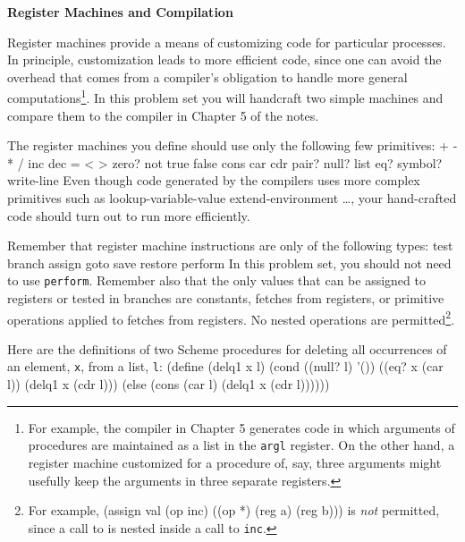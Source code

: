 

\newcommand{\Code}[1]{\mbox{\tt #1}}



\begin{center}
{\bf Register Machines and Compilation}
\end{center}

\medskip

Register machines provide a means of customizing code for particular
processes.  In principle, customization leads to more efficient code,
since one can avoid the overhead that comes from a compiler's obligation
to handle more general computations\footnote{For example, the compiler in Chapter
5 generates code in which arguments of procedures are maintained as a list
in the {\tt argl} register.  On the other hand, a register machine
customized for a procedure of, say, three arguments might usefully keep
the arguments in three separate registers.}.
In this problem set you will handcraft two simple machines and compare
them to the compiler in Chapter 5 of the notes.

The register machines you define should use only the following few
primitives:
\beginlisp
+ - * / inc dec = < > zero?  not true false
cons car cdr pair? null? list eq? symbol? write-line
\endlisp
Even though code generated by the compilers uses more complex primitives
such as
\beginlisp
lookup-variable-value extend-environment \ldots,
\endlisp
your hand-crafted code should turn out to run more efficiently.

Remember that register machine instructions are only of the
following types:
\beginlisp
test branch assign goto save restore perform
\endlisp
In this problem set, you should not need to use {\tt perform}.
Remember also that the only values that can be assigned to registers
or tested in branches are constants, fetches from registers, or
primitive operations applied to fetches from registers.  No nested
operations are permitted\footnote{For example,
(assign val (op inc) ((op *) (reg a) (reg b)))
is {\em not} permitted, since a call to {\tt *} is nested inside a
call to {\tt inc}.}.

\medskip
Here are the definitions of two Scheme procedures for deleting all
occurrences of an element, {\tt x}, from a list, {\tt l}:
\beginlisp
(define (delq1 x l)
  (cond ((null? l) '())
        ((eq? x (car l)) (delq1 x (cdr l)))
        (else (cons (car l) (delq1 x (cdr l))))))
\endlisp

